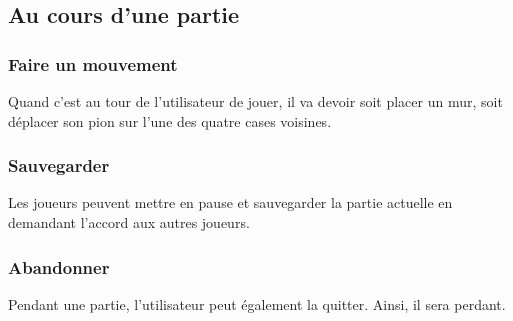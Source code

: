 \subsection{Au cours d'une partie}
    \subsubsection{Faire un mouvement}
    Quand c'est au tour de l'utilisateur de jouer, il va devoir soit placer un mur, soit déplacer son pion sur l'une des quatre cases voisines. 
    \subsubsection{Sauvegarder}
    Les joueurs peuvent mettre en pause et sauvegarder la partie actuelle en demandant l'accord aux autres joueurs.
    \subsubsection{Abandonner}
    Pendant une partie, l'utilisateur peut également la quitter. Ainsi, il sera perdant.

